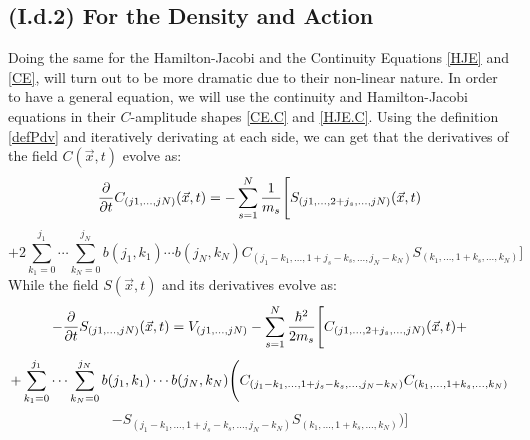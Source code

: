 \documentclass[11pt, a4paper]{article} %
\begin{document}
\subsection*{(I.d.2) For the Density and Action}
\vspace{-0.3cm}
Doing the same for the Hamilton-Jacobi and the Continuity Equations \eqref{HJE} and \eqref{CE}, will turn out to be more dramatic due to their non-linear nature. In order to have a general equation, we will use the continuity and Hamilton-Jacobi equations in their $C$-amplitude shapes \eqref{CE.C} and \eqref{HJE.C}. Using the definition \eqref{defPdv} and iteratively derivating at each side, we can get that the derivatives of the field $C(\vec{x},t)$ evolve as:\vspace{-0.2cm}
\begin{equation}\label{infchain.CE}
\pdv{}{t}C_{(j1,...,jN)}(\vec{x},t)=-\sum_{s=1}^N\frac{1}{m_s} \Bigg[S_{(j1,...,2+j_s,...,jN)}(\vec{x},t) 
\end{equation}
$$
+2 \sum_{k_1=0}^{j_1}\cdots\sum_{k_N=0}^{j_N} b(j_1,k_1)\cdots b(j_N,k_N)C_{(j_1-k_1,...,1+j_s-k_s,...,j_N-k_N)}S_{(k_1,...,1+k_s,...,k_N)} \Bigg]
$$
While the field $S(\vec{x},t)$ and its derivatives evolve as:
\begin{equation}\label{infchain.HJE}
-\pdv{}{t}S_{(j1,...,jN)}(\vec{x},t)=V_{(j1,...,jN)}-\sum_{s=1}^N\frac{\hbar^2}{2m_s} \Bigg[ C_{(j1,...,2+j_s,...,jN)}(\vec{x},t)+\vspace{-0.1cm}
\end{equation}
$$
+\sum_{k_1=0}^{j_1}\cdots\sum_{k_N=0}^{j_N} b(j_1,k_1)\cdots b(j_N,k_N) \Bigg( C_{(j_1-k_1,...,1+j_s-k_s,...,j_N-k_N)}C_{(k_1,...,1+k_s,...,k_N)} \vspace{-0.1cm}
$$
$$
-S_{(j_1-k_1,...,1+j_s-k_s,...,j_N-k_N)}S_{(k_1,...,1+k_s,...,k_N)}  \Bigg)\Bigg]
$$
\end{document}
